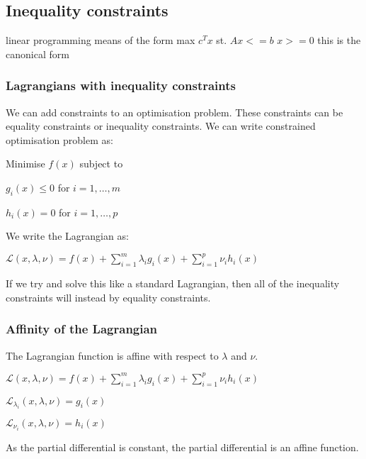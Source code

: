 
\subsection{Inequality constraints}

linear programming means of the form
max \(c^Tx\)
st. \(Ax<=b\)
\(x>=0\)
this is the canonical form

\subsubsection{Lagrangians with inequality constraints}

We can add constraints to an optimisation problem. These constraints can be equality constraints or inequality constraints. We can write constrained optimisation problem as:

Minimise \(f(x)\) subject to 

\(g_i(x)\le 0\) for \(i=1,\dots,m\)

\(h_i(x)=0\) for \(i=1,\dots,p\)

We write the Lagrangian as:

\(\mathcal{L}(x, \lambda, \nu )=f(x)+\sum_{i=1}^m\lambda_i g_i(x)+\sum_{i=1}^p\nu_ih_i(x)\)

If we try and solve this like a standard Lagrangian, then all of the inequality constraints will instead by equality constraints.

\subsubsection{Affinity of the Lagrangian}

The Lagrangian function is affine with respect to \(\lambda \) and \(\nu \).

\(\mathcal{L}(x, \lambda, \nu )=f(x)+\sum_{i=1}^m\lambda_i g_i(x)+\sum_{i=1}^p\nu_ih_i(x)\)

\(\mathcal{L}_{\lambda_i}(x, \lambda, \nu )=g_i(x)\)

\(\mathcal{L}_{\nu_i}(x, \lambda, \nu )=h_i(x)\)

As the partial differential is constant, the partial differential is an affine function.

